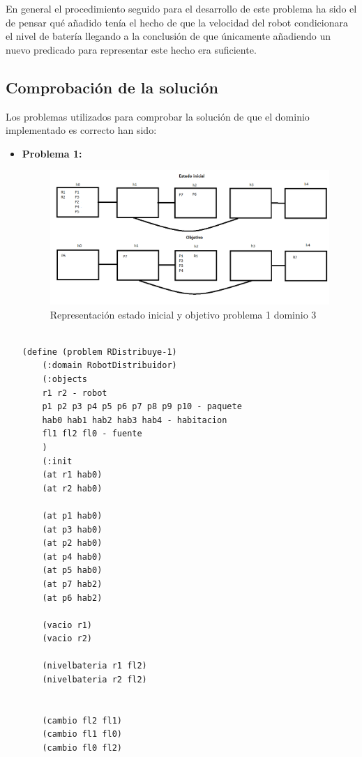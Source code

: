 	En general el procedimiento seguido para el desarrollo de este problema ha sido el de pensar qué añadido tenía el hecho de que la velocidad del robot condicionara el nivel de batería llegando a la conclusión de que únicamente añadiendo un nuevo predicado para representar este hecho era suficiente. \\

\subsection{Comprobación de la solución}

Los problemas utilizados para comprobar la solución de que el dominio implementado es correcto han sido:

\begin{itemize}
	\item \textbf{Problema 1:}

\begin{figure}[h]
	\centering
	\includegraphics[width=1\linewidth]{p3-1}
	\caption{Representación estado inicial y objetivo problema 1 dominio 3}
	\label{fig:p1}
\end{figure}

	\begin{lstlisting}[language=SH]

(define (problem RDistribuye-1)
	(:domain RobotDistribuidor)
	(:objects
	r1 r2 - robot
	p1 p2 p3 p4 p5 p6 p7 p8 p9 p10 - paquete
	hab0 hab1 hab2 hab3 hab4 - habitacion
	fl1 fl2 fl0 - fuente
	)
	(:init
	(at r1 hab0)
	(at r2 hab0)
	
	(at p1 hab0)
	(at p3 hab0)
	(at p2 hab0)
	(at p4 hab0)
	(at p5 hab0)
	(at p7 hab2)
	(at p6 hab2)
	
	(vacio r1)
	(vacio r2)
	
	(nivelbateria r1 fl2)
	(nivelbateria r2 fl2)
	
	
	(cambio fl2 fl1)
	(cambio fl1 fl0)
	(cambio fl0 fl2)
	

\end{lstlisting}
\end{itemize}
